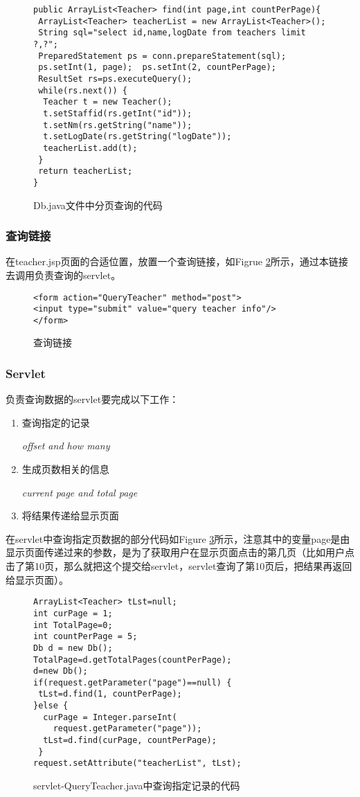 \begin{figure}
\begin{verbatim}
public ArrayList<Teacher> find(int page,int countPerPage){
 ArrayList<Teacher> teacherList = new ArrayList<Teacher>();
 String sql="select id,name,logDate from teachers limit ?,?";
 PreparedStatement ps = conn.prepareStatement(sql);
 ps.setInt(1, page);  ps.setInt(2, countPerPage);
 ResultSet rs=ps.executeQuery();
 while(rs.next()) {
  Teacher t = new Teacher();
  t.setStaffid(rs.getInt("id"));
  t.setNm(rs.getString("name"));
  t.setLogDate(rs.getString("logDate"));
  teacherList.add(t);
 }
 return teacherList;
}
\end{verbatim}
\caption{Db.java文件中分页查询的代码}
\label{Log4j-find}
\end{figure}

\subsubsection{查询链接}
在teacher.jsp页面的合适位置，放置一个查询链接，如Figrue \ref{Log4j-query}所示，通过本链接去调用负责查询的servlet。
\begin{figure}
\begin{verbatim}
<form action="QueryTeacher" method="post">
<input type="submit" value="query teacher info"/>
</form>
\end{verbatim}
\caption{查询链接}
\label{Log4j-query}
\end{figure}
\subsubsection{Servlet}
负责查询数据的servlet要完成以下工作：
\begin{enumerate}
\item
查询指定的记录

\emph{offset and how many}
\item
生成页数相关的信息

\emph{current page and total page}
\item
将结果传递给显示页面

\end{enumerate}

在servlet中查询指定页数据的部分代码如Figure \ref{Log4j-servq}所示，注意其中的变量page是由显示页面传递过来的参数，是为了获取用户在显示页面点击的第几页（比如用户点击了第10页，那么就把这个提交给servlet，servlet查询了第10页后，把结果再返回给显示页面）。
\begin{figure}
\begin{verbatim}
ArrayList<Teacher> tLst=null;
int curPage = 1;
int TotalPage=0;
int countPerPage = 5;
Db d = new Db();
TotalPage=d.getTotalPages(countPerPage);
d=new Db();
if(request.getParameter("page")==null) {
 tLst=d.find(1, countPerPage);
}else {
  curPage = Integer.parseInt(
    request.getParameter("page"));
  tLst=d.find(curPage, countPerPage);
 }		
request.setAttribute("teacherList", tLst);
\end{verbatim}
\caption{servlet-QueryTeacher.java中查询指定记录的代码}
\label{Log4j-servq}
\end{figure}


